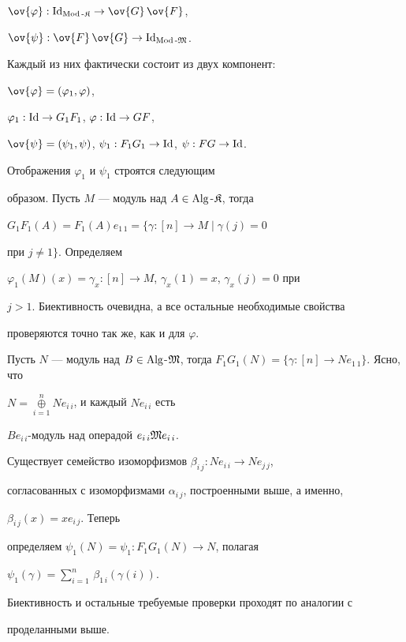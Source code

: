 \begin{pf}
$\ov{\varphi}:\Id_{\Mod\text{-}\frak K} \to \ov{G}\,\ov{F}$,


$\ov{\psi}:\ov{F}\,\ov{G} \to \Id_{\Mod\text{-}\frak M}$.


Каждый из них фактически состоит из двух компонент:


$\ov{\varphi}=(\varphi_1,\varphi)$,


$\varphi_1:\operatorname{Id} \to G_1 F_1$, $\varphi: \operatorname{Id}\to GF$,


$\ov{\psi}=(\psi_1,\psi)$, $\psi_1: F_1 G_1 \to \operatorname{Id}$, $\psi: FG\to \operatorname{Id}$.


Отображения $\varphi_1$ и $\psi_1$ строятся следующим


образом. Пусть $M$ --- модуль над $A\in \operatorname{Alg}$-$\frak K$, тогда


$G_1 F_1(A)=F_1(A)e_{1\,1}=\{\gamma : [n]\to M \mid \gamma(j)=0$


при $j \neq 1\}$. Определяем


$\varphi_1(M)(x)=\gamma_x: [n]\to M$, $\gamma_x(1)=x$, $\gamma_x(j)=0$ при


$j>1$. Биективность очевидна, а все остальные необходимые свойства


проверяются точно так же, как и для $\varphi$.


Пусть $N$ --- модуль над $B\in \Alg$-$\frak M$, тогда $F_1 G_1 (N)=


\{\gamma: [n] \to Ne_{1\,1}\}$. Ясно, что


$N=\mathop{\oplus}\limits_{i=1}^n Ne_{i\,i}$, и каждый $Ne_{i\,i}$ есть


$B e_{i\, i}$-модуль над операдой $e_{i\, i} \frak M e_{i\, i}$.


Существует семейство изоморфизмов $\beta_{i\,j} : Ne_{i\,i}\to Ne_{j\,j}$,


согласованных с изоморфизмами $\alpha_{i\, j}$, построенными выше, а именно,


$\beta_{i\,j}(x)=x e_{i\,j}$. Теперь


определяем $\psi_1(N)=\psi_1: F_1 G_1 (N) \to N$, полагая


$\psi_1(\gamma)=\sum\limits_{i=1}^n\,\beta_{1\,i}(\gamma(i))$.


Биективность и остальные требуемые проверки проходят по аналогии с


проделанными выше.


\end{pf}





